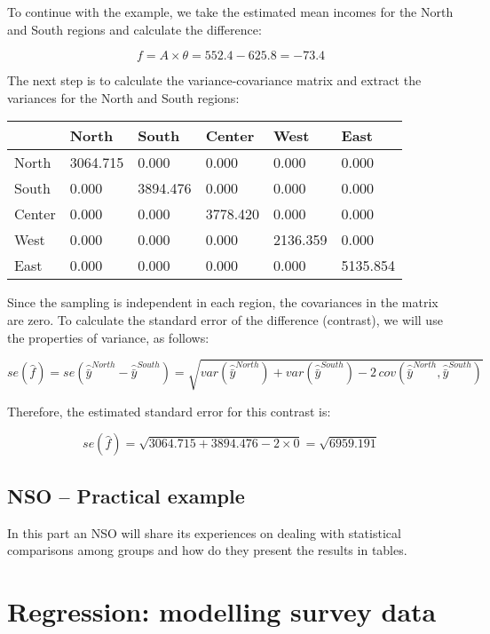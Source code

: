 \documentclass[
  12pt,
]{book}
\begin{document}
To continue with the example, we take the estimated mean incomes for the North and South regions and calculate the difference:

\[
f = A \times \theta = 552.4 - 625.8 = -73.4
\]

The next step is to calculate the variance-covariance matrix and extract the variances for the North and South regions:

\begin{longtable}[]{@{}llllll@{}}
\toprule\noalign{}
& North & South & Center & West & East \\
\midrule\noalign{}
\endhead
\bottomrule\noalign{}
\endlastfoot
North & 3064.715 & 0.000 & 0.000 & 0.000 & 0.000 \\
South & 0.000 & 3894.476 & 0.000 & 0.000 & 0.000 \\
Center & 0.000 & 0.000 & 3778.420 & 0.000 & 0.000 \\
West & 0.000 & 0.000 & 0.000 & 2136.359 & 0.000 \\
East & 0.000 & 0.000 & 0.000 & 0.000 & 5135.854 \\
\end{longtable}

Since the sampling is independent in each region, the covariances in the matrix are zero. To calculate the standard error of the difference (contrast), we will use the properties of variance, as follows:

\[
se(\widehat{f}) = se\left(\widehat{\bar{y}}^{North} - \widehat{\bar{y}}^{South}\right) = \sqrt{var\left(\widehat{\bar{y}}^{North}\right) + var\left(\widehat{\bar{y}}^{South}\right) - 2 \, cov\left(\widehat{\bar{y}}^{North}, \widehat{\bar{y}}^{South}\right)}
\]

Therefore, the estimated standard error for this contrast is:

\[
se(\widehat{f}) = \sqrt{3064.715 + 3894.476 - 2 \times 0} = \sqrt{6959.191}
\]

\hypertarget{nso-practical-example-1}{%
\section{NSO -- Practical example}\label{nso-practical-example-1}}

In this part an NSO will share its experiences on dealing with statistical comparisons among groups and how do they present the results in tables.

\hypertarget{regression-modelling-survey-data}{%
\chapter{Regression: modelling survey data}\label{regression-modelling-survey-data}}
\end{document}
